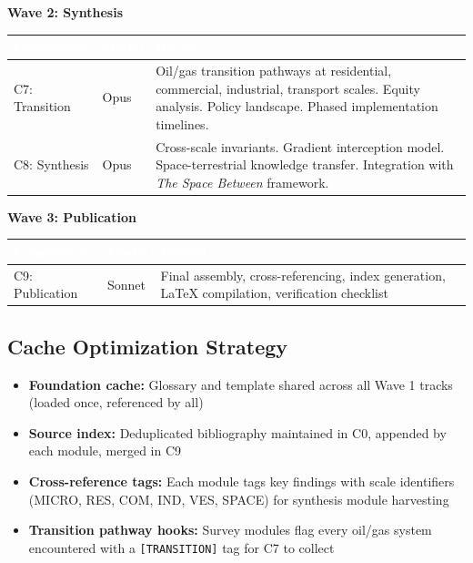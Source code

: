 \documentclass[11pt,letterpaper]{article}
\newcommand{\tableheader}[1]{\textbf{\sffamily\textcolor{white}{#1}}}
\begin{document}
\textbf{Wave 2: Synthesis}

\begin{center}
\begin{tabularx}{\textwidth}{L{2.5cm}L{2cm}X}
\toprule
{}
\tableheader{Component} & \tableheader{Model} & \tableheader{Output} \\
\midrule
C7: Transition & Opus & Oil/gas transition pathways at residential, commercial, industrial, transport scales. Equity analysis. Policy landscape. Phased implementation timelines. \\
C8: Synthesis & Opus & Cross-scale invariants. Gradient interception model. Space-terrestrial knowledge transfer. Integration with \textit{The Space Between} framework. \\
\bottomrule
\end{tabularx}
\end{center}

\textbf{Wave 3: Publication}

\begin{center}
\begin{tabularx}{\textwidth}{L{2.5cm}L{2cm}X}
\toprule
{}
\tableheader{Component} & \tableheader{Model} & \tableheader{Output} \\
\midrule
C9: Publication & Sonnet & Final assembly, cross-referencing, index generation, LaTeX compilation, verification checklist \\
\bottomrule
\end{tabularx}
\end{center}

\subsection{Cache Optimization Strategy}

\begin{itemize}[leftmargin=2em]
\item \textbf{Foundation cache:} Glossary and template shared across all Wave 1 tracks (loaded once, referenced by all)
\item \textbf{Source index:} Deduplicated bibliography maintained in C0, appended by each module, merged in C9
\item \textbf{Cross-reference tags:} Each module tags key findings with scale identifiers (MICRO, RES, COM, IND, VES, SPACE) for synthesis module harvesting
\item \textbf{Transition pathway hooks:} Survey modules flag every oil/gas system encountered with a \texttt{[TRANSITION]} tag for C7 to collect
\end{itemize}
\end{document}
